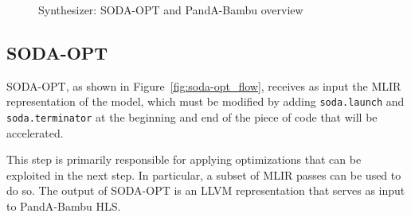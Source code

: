 \begin{figure}[t]
    \centering
    \hspace{0.03\textwidth}
    \caption{Synthesizer: SODA-OPT and PandA-Bambu overview~\cite{9786533}}
    \label{fig:synthesizer_flow}
\end{figure}

\subsection{SODA-OPT}
\label{subsec:toolchain-soda_opt}%

SODA-OPT, as shown in Figure~\ref{fig:soda-opt_flow}, receives as input the MLIR representation of the model, which must be modified by adding \texttt{soda.launch} and \texttt{soda.terminator} at the beginning and end of the piece of code that will be accelerated.

This step is primarily responsible for applying optimizations that can be exploited in the next step.
In particular, a subset of MLIR passes can be used to do so.
The output of SODA-OPT is an LLVM representation that serves as input to PandA-Bambu HLS\@.

